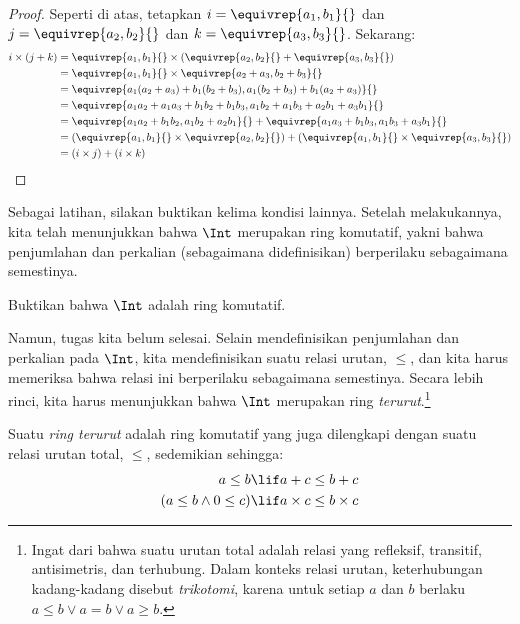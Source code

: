 \documentclass[../../../include/open-logic-section]{subfiles}
\begin{document}
\begin{proof}
Seperti di atas, tetapkan $i = \equivrep{a_1, b_1}{}$ dan $j =
\equivrep{a_2,b_2}{}$ dan $k = \equivrep{a_3, b_3}{}$. Sekarang:
\begin{align*}
	i \times (j + k) 
	&= \equivrep{a_1, b_1}{} \times (\equivrep{a_2,b_2}{} + \equivrep{a_3, b_3}{})\\
	&= \equivrep{a_1, b_1}{} \times \equivrep{a_2 + a_3,b_2+b_3}{}\\
	&= \equivrep{a_1  (a_2 + a_3) + b_1  (b_2+b_3), a_1  (b_2 + b_3) + b_1 (a_2 + a_3)}{}\\
	&= \equivrep{a_1 a_2 + a_1a_3 + b_1 b_2+b_1b_3, a_1 b_2 + a_1b_3 + a_2b_1 + a_3b_1}{}\\		
	&= \equivrep{a_1a_2 + b_1b_2, a_1b_2 + a_2b_1}{} + \equivrep{a_1a_3 + b_1b_3, a_1b_3 + a_3b_1}{}\\
	&= (\equivrep{a_1, b_1}{} \times \equivrep{a_2,b_2}{}) + (\equivrep{a_1, b_1}{} \times  \equivrep{a_3, b_3}{})\\
	&= (i \times j) + (i \times k)
\end{align*}
\end{proof}

Sebagai latihan, silakan buktikan kelima kondisi lainnya. Setelah
melakukannya, kita telah menunjukkan bahwa $\Int$ merupakan ring komutatif,
yakni bahwa penjumlahan dan perkalian (sebagaimana didefinisikan) berperilaku
sebagaimana semestinya.

\begin{prob}
Buktikan bahwa $\Int$ adalah ring komutatif.
\end{prob}

Namun, tugas kita belum selesai. Selain mendefinisikan penjumlahan dan
perkalian pada $\Int$, kita mendefinisikan suatu relasi urutan, $\leq$, dan
kita harus memeriksa bahwa relasi ini berperilaku sebagaimana semestinya.
Secara lebih rinci, kita harus menunjukkan bahwa $\Int$ merupakan ring
\emph{terurut}.\footnote{Ingat dari
	 bahwa suatu urutan total
	adalah relasi yang refleksif, transitif, antisimetris, dan terhubung.
	Dalam konteks relasi urutan, keterhubungan kadang-kadang disebut
	\emph{trikotomi}, karena untuk setiap $a$ dan $b$ berlaku $a \leq b \lor a
	= b \lor a \geq b$.}

\begin{defn}
Suatu \emph{ring terurut} adalah ring komutatif yang juga dilengkapi
dengan suatu relasi urutan total, $\leq$, sedemikian sehingga:
\begin{align*}
	a \leq b &\lif a + c \leq b + c\\
	(a \leq b \land 0 \leq c) &\lif a \times c \leq b \times c
\end{align*}
\end{defn}
\end{document}
